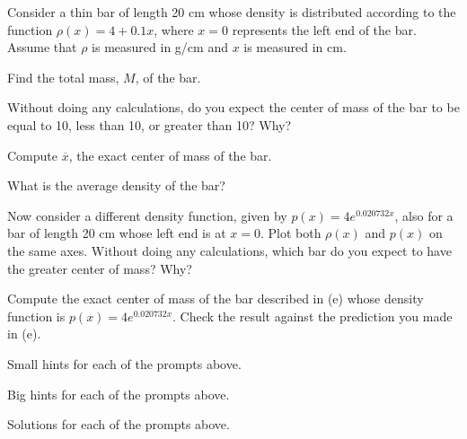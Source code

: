 \begin{activity} \label{A:6.3.3} Consider a thin bar of length 20 cm whose density is distributed according to the function $\rho(x) = 4 + 0.1x$, where $x = 0$ represents the left end of the bar.  Assume that $\rho$ is measured in g/cm and $x$ is measured in cm.
\ba
	\item Find the total mass, $M$, of the bar.
	\item Without doing any calculations, do you expect the center of mass of the bar to be equal to 10, less than 10, or greater than 10?  Why?
	\item Compute $\overline{x}$, the exact center of mass of the bar.
	\item What is the average density of the bar?  
	\item Now consider a different density function, given by $p(x) = 4e^{0.020732x}$, also for a bar of length 20 cm whose left end is at $x = 0$.  Plot both $\rho(x)$ and $p(x)$ on the same axes.  Without doing any calculations, which bar do you expect to have the greater center of mass?  Why?
	\item Compute the exact center of mass of the bar described in (e) whose density function is $p(x) = 4e^{0.020732x}$.  Check the result against the prediction you made in (e).
\ea

\end{activity}
\begin{smallhint}
\ba
	\item Small hints for each of the prompts above.
\ea
\end{smallhint}
\begin{bighint}
\ba
	\item Big hints for each of the prompts above.
\ea
\end{bighint}
\begin{activitySolution}
\ba
	\item Solutions for each of the prompts above.
\ea
\end{activitySolution}
\aftera